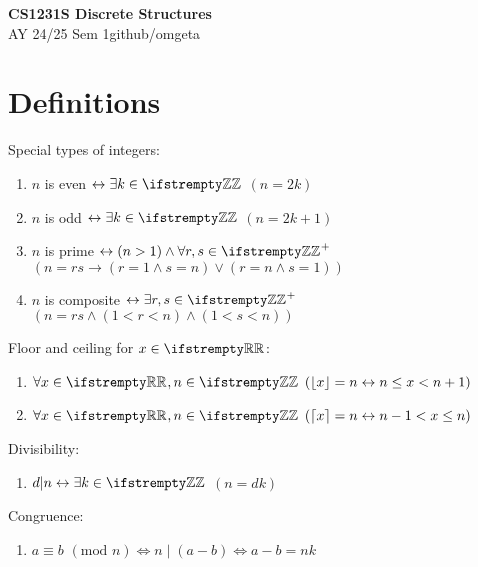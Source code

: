\documentclass[12pt, a4paper]{article}
\newcommand{\mytitle}{CS1231S Discrete Structures}
\newcommand{\myauthor}{github/omgeta}
\newcommand{\mydate}{AY 24/25 Sem 1}
\begin{document}
\raggedright
\footnotesize
\begin{multicols*}{3}
\setlength{\premulticols}{1pt}
\setlength{\postmulticols}{1pt}
\setlength{\multicolsep}{1pt}
\setlength{\columnsep}{2pt}

{\normalsize{\textbf{\mytitle}}} \\
{\footnotesize{\mydate\hspace{2pt}\textemdash\hspace{2pt}\myauthor}}
\section*{Definitions}
Special types of integers:
\begin{enumerate}[\roman*.]
  \item $n$ is even $\iff \exists k \in \ZZ$ $(n = 2k)$
  \item $n$ is odd $\iff \exists k \in \ZZ$ $(n = 2k+1)$
  \item $n$ is prime $\iff (n > 1) \land \forall r, s \in \ZZ^+$\\
    $(n=rs \rightarrow (r=1 \land s=n) \lor (r = n \land s = 1 ))$
  \item $n$ is composite $\iff \exists r, s \in \ZZ^+$\\
    $(n=rs \land (1 < r < n) \land (1 < s < n))$
\end{enumerate}

Floor and ceiling for $x \in \RR$:
\begin{enumerate}[\roman*.]
  \item $\forall x \in \RR, n \in \ZZ$ $(\left\lfloor x \right\rfloor = n \leftrightarrow n \leq x < n+1)$
  \item $\forall x \in \RR, n \in \ZZ$ $(\left\lceil x \right\rceil = n \leftrightarrow n-1 < x \leq n)$
\end{enumerate}

Divisibility:
\begin{enumerate}[\roman*.]
  \item $d|n \iff \exists k \in \ZZ$ $(n = dk)$
\end{enumerate}

Congruence:
\begin{enumerate}[\roman*.]
  \item $a \equiv b$ $(\text{mod }n) \iff n\mid(a-b) \iff a - b = nk$
\end{enumerate}



\end{multicols*}
\end{document}
